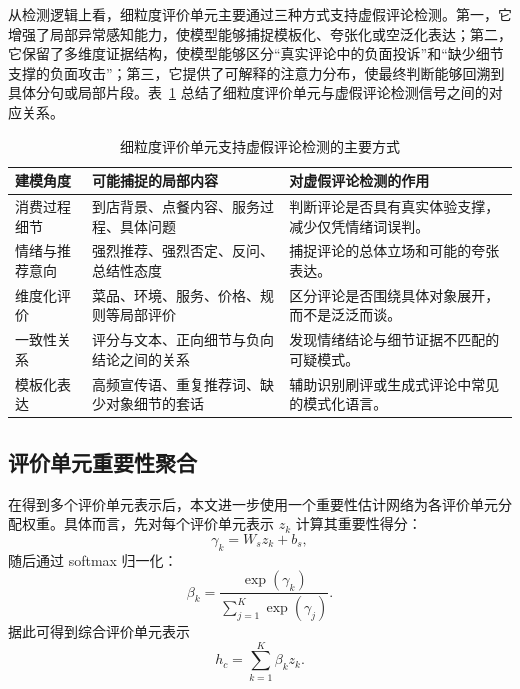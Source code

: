 \documentclass[UTF8,oneside,openright,fontset=none]{ctexbook}
\numberwithin{equation}{chapter}
\begin{document}
从检测逻辑上看，细粒度评价单元主要通过三种方式支持虚假评论检测。第一，它增强了局部异常感知能力，使模型能够捕捉模板化、夸张化或空泛化表达；第二，它保留了多维度证据结构，使模型能够区分“真实评论中的负面投诉”和“缺少细节支撑的负面攻击”；第三，它提供了可解释的注意力分布，使最终判断能够回溯到具体分句或局部片段。表~\ref{tab:claim-detection-role} 总结了细粒度评价单元与虚假评论检测信号之间的对应关系。

\begin{table}[htbp]
  \centering
  \small
  \caption{细粒度评价单元支持虚假评论检测的主要方式}
  \label{tab:claim-detection-role}
  \begin{tabularx}{\textwidth}{lXX}
    \toprule
    建模角度 & 可能捕捉的局部内容 & 对虚假评论检测的作用 \\
    \midrule
    消费过程细节 & 到店背景、点餐内容、服务过程、具体问题 & 判断评论是否具有真实体验支撑，减少仅凭情绪词误判。 \\
    情绪与推荐意向 & 强烈推荐、强烈否定、反问、总结性态度 & 捕捉评论的总体立场和可能的夸张表达。 \\
    维度化评价 & 菜品、环境、服务、价格、规则等局部评价 & 区分评论是否围绕具体对象展开，而不是泛泛而谈。 \\
    一致性关系 & 评分与文本、正向细节与负向结论之间的关系 & 发现情绪结论与细节证据不匹配的可疑模式。 \\
    模板化表达 & 高频宣传语、重复推荐词、缺少对象细节的套话 & 辅助识别刷评或生成式评论中常见的模式化语言。 \\
    \bottomrule
  \end{tabularx}
\end{table}

\subsection{评价单元重要性聚合}

在得到多个评价单元表示后，本文进一步使用一个重要性估计网络为各评价单元分配权重。具体而言，先对每个评价单元表示 $z_k$ 计算其重要性得分：
\begin{equation}
  \gamma_k = W_s z_k + b_s,
\end{equation}
随后通过 softmax 归一化：
\begin{equation}
  \beta_k = \frac{\exp(\gamma_k)}{\sum_{j=1}^{K}\exp(\gamma_j)}.
\end{equation}
据此可得到综合评价单元表示
\begin{equation}
  h_c = \sum_{k=1}^{K} \beta_k z_k.
\end{equation}
\end{document}
